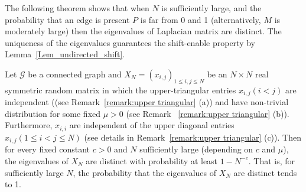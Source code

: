 \documentclass[journal]{IEEEtran}
\begin{document}

The following theorem shows that when $N$ is sufficiently large, and the probability that an edge is present $P$ is far from 0 and 1 (alternatively, $M$ is moderately large) then the eigenvalues of Laplacian matrix are distinct. The uniqueness of the eigenvalues guarantees the shift-enable property by Lemma~\ref{Lem_undirected_shift}.
\begin{Thm}{\label{Thm: simple spectrum}}
	Let $\mathcal{G}$ be a connected graph and $X_N=(x_{i,j})_{1\leq i,j \leq N}$ be an $N\times N$ real symmetric random matrix in which the upper-triangular entries $x_{i,j} (i<j)$ are independent ((see Remark~\ref{remark:upper triangular} (a))
	and have non-trivial distribution  for some fixed $\mu>0$ (see Remark ~\ref{remark:upper triangular} (b)). %
	Furthermore, 
	$x_{i,i}$ are independent of the upper diagonal entries $x_{i,j} (1\leq i<j\leq N)$ (see details in Remark~\ref{remark:upper triangular} (c)).
	Then for every fixed constant $c>0$ and $N$ sufficiently
large (depending on $c$ and $\mu$), the eigenvalues of $X_N$ are distinct with probability at
least $1-N^{-c}$. 
That is, for sufficiently large $N$, the probability that the eigenvalues of $X_N$ are distinct tends to 1.
\end{Thm}
\end{document}
